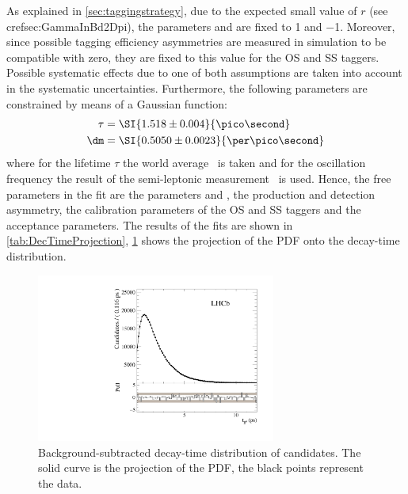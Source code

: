 As explained in \cref{sec:taggingstrategy}, due to the expected small value of $r$ (see cref{sec:GammaInBd2Dpi}), the parameters \Cf and \Cfbar are fixed to \num{1} and \num{-1}.
Moreover, since possible tagging efficiency asymmetries are measured in simulation to be compatible with zero, they are fixed to this value for the OS and SS taggers.
Possible systematic effects due to one of both assumptions are taken into account in the systematic uncertainties.
Furthermore, the following parameters are constrained by means of a Gaussian function:
\begin{equation}
\begin{aligned}
\tau&=\SI{1.518\pm0.004}{\pico\second}\\
\dm&=\SI{0.5050\pm0.0023}{\per\pico\second}
\end{aligned}
\end{equation}
where for the lifetime $\tau$ the world average~\cite{PDG_2017} is taken and for the oscillation frequency \dm the result of the semi-leptonic \lhcb measurement~\cite{Aaij:2016fdk} is used.
Hence, the free parameters in the fit are the \CP parameters \Sf and \Sfbar, the production and detection asymmetry, the calibration parameters of the OS and SS taggers and the acceptance parameters.
The results of the fits are shown in \cref{tab:DecTimeProjection}, \cref{fig:DecTimeProjection} shows the projection of the PDF onto the decay-time distribution.
\begin{figure}[tbp]
    \centering
    \includegraphics[width=0.7\textwidth]{09TimeFit/figs/BeautyTime_pull.pdf}
    \caption{Background-subtracted decay-time distribution of \BdToDpi candidates.
    The solid curve is the projection of the PDF, the black points represent the data.}
    \label{fig:DecTimeProjection}
\end{figure}


